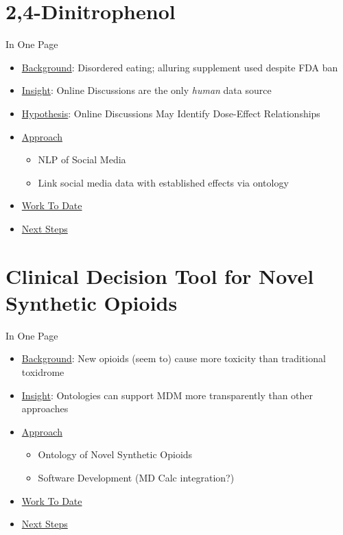 \section{2,4-Dinitrophenol}

\begin{frame}{In One Page}
\addtolength{\leftmargini}{\labelsep}
\begin{itemize}
	\item[] \uline{Background}: Disordered eating; alluring supplement used despite FDA ban
	\item[] \uline{Insight}: Online Discussions are the only \emph{human} data source
	\item[] \uline{Hypothesis}: Online Discussions May Identify Dose-Effect Relationships
	\item[] \uline{Approach}
	\begin{itemize}
		\item[] NLP of Social Media
		\item[] Link social media data with established effects via ontology
	\end{itemize} 
	\item[] \uline{Work To Date}
	\item[] \uline{Next Steps}
\end{itemize}
\end{frame}

\section[Decision Tool]{Clinical Decision Tool for Novel Synthetic Opioids}
\begin{frame}{In One Page}
\addtolength{\leftmargini}{\labelsep}
\begin{itemize}
	\item[] \uline{Background}: New opioids (seem to) cause more toxicity than traditional toxidrome
	\item[] \uline{Insight}: Ontologies can support MDM more transparently than other approaches
	\item[] \uline{Approach}
	\begin{itemize}
		\item[] Ontology of Novel Synthetic Opioids
		\item[] Software Development (MD Calc integration?)
	\end{itemize} 
	\item[] \uline{Work To Date}
	\item[] \uline{Next Steps}
\end{itemize}
\end{frame}


